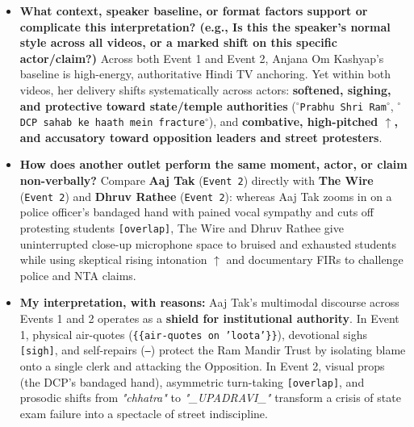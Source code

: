 \documentclass[10pt,a4paper]{article}
\begin{document}
\begin{itemize}
  \item \textbf{What context, speaker baseline, or format factors support or complicate this interpretation? (e.g., Is this the speaker's normal style across all videos, or a marked shift on this specific actor/claim?)}
Across both Event 1 and Event 2, Anjana Om Kashyap's baseline is high-energy, authoritative Hindi TV anchoring. Yet within both videos, her delivery shifts systematically across actors: \textbf{softened, sighing, and protective toward state/temple authorities} (\texttt{$^\circ$Prabhu Shri Ram$^\circ$}, \texttt{$^\circ$DCP sahab ke haath mein fracture$^\circ$}), and \textbf{combative, high-pitched \texttt{$\uparrow$}, and accusatory toward opposition leaders and street protesters}.\par\smallskip
  \item \textbf{How does another outlet perform the same moment, actor, or claim non-verbally?}
Compare \textbf{Aaj Tak} (\texttt{Event 2}) directly with \textbf{The Wire} (\texttt{Event 2}) and \textbf{Dhruv Rathee} (\texttt{Event 2}): whereas Aaj Tak zooms in on a police officer's bandaged hand with pained vocal sympathy and cuts off protesting students \texttt{[overlap]}, The Wire and Dhruv Rathee give uninterrupted close-up microphone space to bruised and exhausted students while using skeptical rising intonation \texttt{$\uparrow$} and documentary FIRs to challenge police and NTA claims.\par\smallskip
  \item \textbf{My interpretation, with reasons:}
Aaj Tak's multimodal discourse across Events 1 and 2 operates as a \textbf{shield for institutional authority}. In Event 1, physical air-quotes (\texttt{\{\{air-quotes on 'loota'\}\}}), devotional sighs \texttt{[sigh]}, and self-repairs (\texttt{---}) protect the Ram Mandir Trust by isolating blame onto a single clerk and attacking the Opposition. In Event 2, visual props (the DCP's bandaged hand), asymmetric turn-taking \texttt{[overlap]}, and prosodic shifts from \textit{"chhatra"} to \textit{"\_UPADRAVI\_"} transform a crisis of state exam failure into a spectacle of street indiscipline.\par\smallskip
\end{itemize}
\end{document}
